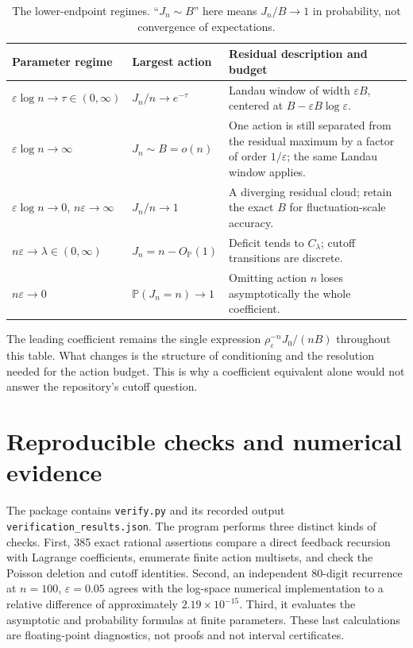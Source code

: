 \documentclass[11pt,a4paper]{article}
\theoremstyle{definition}\newtheorem{definition}[theorem]{Definition}
\theoremstyle{remark}\newtheorem{remark}[theorem]{Remark}
\newcommand{\eps}{\varepsilon}
\newcommand{\Prob}{\mathbb P}
\newcommand{\1}{\mathbf 1}
\begin{document}
\begin{table}[htbp]\centering\small
\begin{tabular}{@{}p{}p{}p{}@{}}
\toprule
Parameter regime & Largest action & Residual description and budget \\
\midrule
$\eps\log n\to\tau\in(0,\infty)$
& $J_n/n\to e^{-\tau}$
& Landau window of width $\eps B$, centered at $B-\eps B\log\eps$.\\[5pt]
$\eps\log n\to\infty$
& $J_n\sim B=o(n)$
& One action is still separated from the residual maximum by a factor
of order $1/\eps$; the same Landau window applies.\\[5pt]
$\eps\log n\to0$, $n\eps\to\infty$
& $J_n/n\to1$
& A diverging residual cloud; retain the exact $B$ for fluctuation-scale
accuracy.\\[5pt]
$n\eps\to\lambda\in(0,\infty)$
& $J_n=n-O_{\Prob}(1)$
& Deficit tends to $C_\lambda$; cutoff transitions are discrete.\\[5pt]
$n\eps\to0$
& $\Prob(J_n=n)\to1$
& Omitting action $n$ loses asymptotically the whole coefficient.\\
\bottomrule
\end{tabular}
\caption{The lower-endpoint regimes. ``$J_n\sim B$'' here means
$J_n/B\to1$ in probability, not convergence of expectations.}
\label{tab:regimes}
\end{table}

The leading coefficient remains the single expression
$\rho_{\eps}^{-n}J_0/(nB)$ throughout this table. What changes is the
structure of conditioning and the resolution needed for the action
budget. This is why a coefficient equivalent alone would not answer the
repository's cutoff question.

\section{Reproducible checks and numerical evidence}
\label{sec:computation}

The package contains \texttt{verify.py} and its recorded output
\texttt{verification\_results.json}. The program performs three distinct
kinds of checks. First, 385 exact rational assertions compare a direct
feedback recursion with Lagrange coefficients, enumerate finite action
multisets, and check the Poisson deletion and cutoff identities.
Second, an independent 80-digit recurrence at $n=100$, $\eps=0.05$
agrees with the log-space numerical implementation to a relative
difference of approximately $2.19\times10^{-15}$. Third, it evaluates
the asymptotic and probability formulas at finite parameters. These last
calculations are floating-point diagnostics, not proofs and not interval
certificates.
\end{document}
